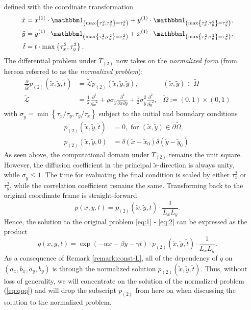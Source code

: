 defined with the coordinate transformation
\begin{align}
  \tilde{x} &= x^{(1)}\cdot \Indicator{ \max\left\{\tau_x^2, \tau_y^2 \right\} = \tau_x^2} + y^{(1)}\cdot \Indicator{ \max\left\{\tau_x^2, \tau_y^2 \right\} = \tau_y^2}, \\
  \tilde{y} &= y^{(1)}\cdot \Indicator{ \max\left\{\tau_x^2, \tau_y^2 \right\} = \tau_x^2} + x^{(1)}\cdot \Indicator{ \max\left\{\tau_x^2, \tau_y^2 \right\} = \tau_y^2}, \\
  \tilde{t} &= t\cdot \max\left\{\tau_x^2, \tau_y^2 \right\}. 
\end{align}
The differential problem under $T_{(2)}$ now takes on the
\textit{normalized form} (from hereon referred to as the
\textit{normalized problem}):
\begin{align}
  \frac{\partial}{\partial \tilde{t}} p_{(2)}(\tilde{x},\tilde{y},\tilde{t}) &= \tilde{\mathcal{L}} p_{(2)}(\tilde{x},\tilde{y},\tilde{y}), & (\tilde{x}, \tilde{y}) \in \tilde{\Omega} \label{eq:qqq} \\
  \tilde{\mathcal{L}} &= \frac{1}{2} \frac{\partial^2}{\partial \tilde{x}^2} + \rho \sigma_{\tilde{y}} \frac{\partial^2}{\partial \tilde{x} \partial \tilde{y}} + \frac{1}{2} \sigma^2_{\tilde{y}} \frac{\partial^2}{\partial \tilde{y}^2},& \tilde{\Omega} := (0,1) \times (0,1)
\end{align}
with
$\sigma_{\tilde{y}} = \min\left\{ \tau_x/\tau_y, \tau_y/\tau_x
\right\}$ subject to the initial and boundary conditions
\begin{align}
  p_{(2)}(\tilde{x},\tilde{y},\tilde{t}) &=0,  \mbox{ for }  (\tilde{x},\tilde{y}) \in \partial\tilde{\Omega}, \nonumber \\
  p_{(2)}(\tilde{x},\tilde{y},0) &= \delta\left( \tilde{x} - \tilde{x}_0 \right)\delta\left( \tilde{y} - \tilde{y}_0 \right). \label{eq:qqq-2}
\end{align}
As seen above, the computational domain under $T_{(2)}$ remains the
unit square. However, the diffusion coefficient in the principal
$\tilde{x}$-direction is always unity, while
$\sigma_{\tilde{y}} \leq 1$. The time for evaluating the final
condition is scaled by either $\tau_x^2$ or $\tau_y^2$, while the
correlation coefficient remains the same. Transforming back to the
original coordinate frame is straight-forward 
\[
  p(x,y,t) = p_{(2)}(\tilde{x}, \tilde{y}, \tilde{t}) \cdot \frac{1}{L_xL_y}.
\]
Hence, the solution to the original problem \eqref{eq:1} -
\eqref{eq:2} can be expressed as the product
\[
  q(x,y,t) = \exp(-\alpha x - \beta y - \gamma t) \cdot
  p_{(2)}(\tilde{x}, \tilde{y}, \tilde{t}) \cdot \frac{1}{L_xL_y}.
\]
As a consequence of Remark \ref{remark:const-L}, all of the dependency
of $q$ on $(a_x,b_x,a_y,b_y)$ is through the normalized solution
$p_{(2)}(\tilde{x},\tilde{y},\tilde{t})$. Thus, without loss of
generality, we will concentrate on the solution of the normalized
problem (\ref{eq:qqq}) and will drop the subscript $p_{(2)}$ from here
on when discussing the solution to the normalized problem.



